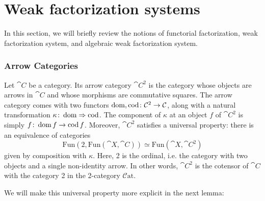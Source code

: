 
\chapter{Weak factorization systems}

In this section, we will briefly review the notions of functorial factorization, weak factorization system, and algebraic weak factorization system. 

\subsection{Arrow Categories}

Let $\cat{C}$ be a category. Its arrow category $\cat{C}^2$ is the category whose objects are arrows in $\cat{C}$ and whose morphisms are commutative squares. The arrow category comes with two functors $\operatorname{dom},\operatorname{cod}\colon \mathcal{C}^2\to\mathcal{C}$, along with a natural transformation $\kappa\colon\operatorname{dom}\Rightarrow\operatorname{cod}$. The component of $\kappa$ at an object $f$ of $\cat{C}^2$ is simply $f\colon\operatorname{dom} f\to\operatorname{cod} f$. Moreover, $\cat{C}^2$ satisfies a universal property: there is an equivalence of categories
\begin{equation}\label{Eq:ArrowObject}
	\mathrm{Fun}(2,\mathrm{Fun}(\cat{X},\cat{C}))\simeq\mathrm{Fun}(\cat{X},\cat{C}^2)
\end{equation}
given by composition with $\kappa$. Here, 2 is the ordinal, i.e. the category with two objects and a single non-identity arrow. In other words, $\cat{C}^2$ is the cotensor of $\cat{C}$ with the category 2 in the 2-category $\mathcal{C}\mathrm{at}$.

We will make this universal property more explicit in the next lemma:

